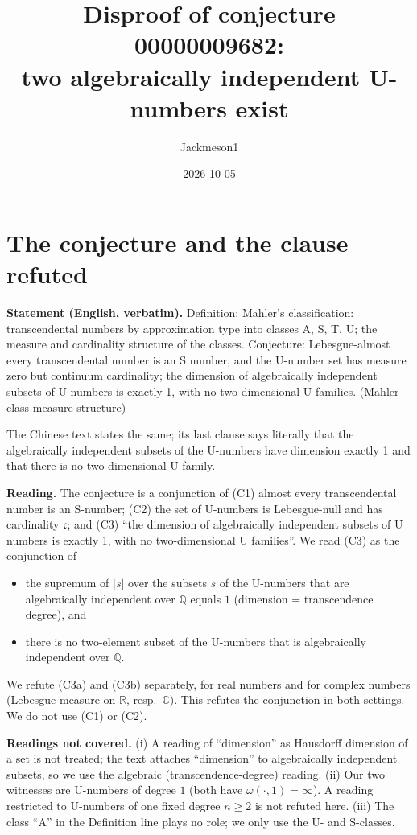 \documentclass[11pt]{article}
\title{Disproof of conjecture 00000009682:\\ two algebraically independent U-numbers exist}
\author{Jackmeson1}
\date{2026-10-05}
\theoremstyle{definition}
\begin{document}
\maketitle

\section{The conjecture and the clause refuted}

\textbf{Statement (English, verbatim).} Definition: Mahler's classification: transcendental
numbers by approximation type into classes A, S, T, U; the measure and cardinality structure of
the classes. Conjecture: Lebesgue-almost every transcendental number is an S number, and the
U-number set has measure zero but continuum cardinality; the dimension of algebraically
independent subsets of U numbers is exactly 1, with no two-dimensional U families. (Mahler class
measure structure)

The Chinese text states the same; its last clause says literally that the algebraically
independent subsets of the U-numbers have dimension exactly 1 and that there is no
two-dimensional U family.

\textbf{Reading.} The conjecture is a conjunction of
(C1) almost every transcendental number is an S-number;
(C2) the set of U-numbers is Lebesgue-null and has cardinality $\mathfrak c$; and
(C3) ``the dimension of algebraically independent subsets of U numbers is exactly 1, with no
two-dimensional U families''. We read (C3) as the conjunction of
\begin{itemize}
\item[(C3a)] the supremum of $|s|$ over the subsets $s$ of the U-numbers that are
  algebraically independent over $\mathbb Q$ equals $1$ (dimension = transcendence degree), and
\item[(C3b)] there is no two-element subset of the U-numbers that is algebraically independent
  over $\mathbb Q$.
\end{itemize}
We refute (C3a) and (C3b) separately, for real numbers and for complex numbers
(Lebesgue measure on $\mathbb R$, resp.\ $\mathbb C$). This refutes the conjunction in both
settings. We do not use (C1) or (C2).

\textbf{Readings not covered.} (i) A reading of ``dimension'' as Hausdorff dimension of a set
is not treated; the text attaches ``dimension'' to algebraically independent subsets, so we use
the algebraic (transcendence-degree) reading. (ii) Our two witnesses are U-numbers of degree $1$
(both have $\omega(\cdot,1)=\infty$). A reading restricted to U-numbers of one fixed degree
$n\ge 2$ is not refuted here. (iii) The class ``A'' in the Definition line plays no role; we
only use the U- and S-classes.
\end{document}
